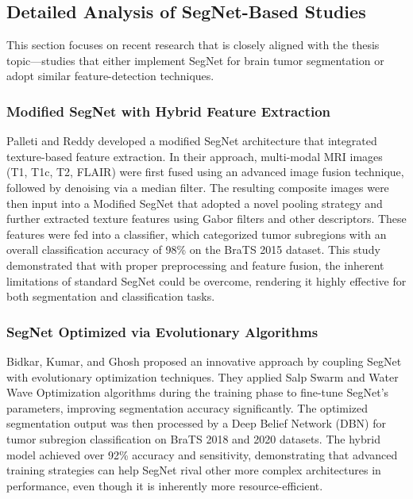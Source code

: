 \subsection{Detailed Analysis of SegNet-Based Studies}
\label{sec:segnet_studies}
This section focuses on recent research that is closely aligned with the thesis topic—studies that either implement SegNet for brain tumor segmentation or adopt similar feature-detection techniques.

\subsubsection{Modified SegNet with Hybrid Feature Extraction}
\label{sec:modified_segnet}
Palleti and Reddy \cite{palleti2025modified} developed a modified SegNet architecture that integrated texture-based feature extraction. In their approach, multi-modal MRI images (T1, T1c, T2, FLAIR) were first fused using an advanced image fusion technique, followed by denoising via a median filter. The resulting composite images were then input into a Modified SegNet that adopted a novel pooling strategy and further extracted texture features using Gabor filters \cite{gabor1946theory} and other descriptors. These features were fed into a classifier, which categorized tumor subregions with an overall classification accuracy of 98\% on the BraTS 2015 dataset. This study demonstrated that with proper preprocessing and feature fusion, the inherent limitations of standard SegNet could be overcome, rendering it highly effective for both segmentation and classification tasks.

\subsubsection{SegNet Optimized via Evolutionary Algorithms}
\label{sec:evolutionary_segnet}
Bidkar, Kumar, and Ghosh \cite{bidkar2022evolutionary} proposed an innovative approach by coupling SegNet with evolutionary optimization techniques. They applied Salp Swarm and Water Wave Optimization algorithms during the training phase to fine-tune SegNet's parameters, improving segmentation accuracy significantly. The optimized segmentation output was then processed by a Deep Belief Network (DBN) for tumor subregion classification on BraTS 2018 and 2020 datasets. The hybrid model achieved over 92\% accuracy and sensitivity, demonstrating that advanced training strategies can help SegNet rival other more complex architectures in performance, even though it is inherently more resource-efficient.

